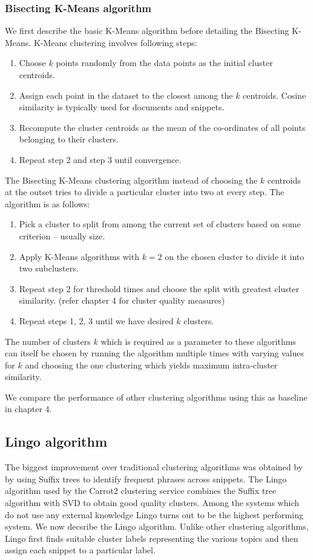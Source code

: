 \documentclass[a4paper,12pt]{report}
\begin{document}
\subsubsection{Bisecting K-Means algorithm}
We first describe the basic K-Means algorithm before detailing the
Bisecting K-Means. K-Means clustering involves following steps:
\begin{enumerate}
  \item Choose $k$ points randomly from the data points as the initial
    cluster centroids.
  \item Assign each point in the dataset to the closest among the $k$
    centroids. Cosine similarity is typically used for documents and
    snippets. 
  \item Recompute the cluster centroids as the mean of the
    co-ordinates of all points belonging to their clusters.
  \item Repeat step 2 and step 3 until convergence.
\end{enumerate}

The Bisecting K-Means clustering algorithm instead of choosing the $k$
centroids at the outset tries to divide a particular cluster into two
at every step. The algorithm is as follows:

\begin{enumerate}
  \item Pick a cluster to split from among the current set of clusters
    based on some criterion -- usually size.
  \item Apply K-Means algorithms with $k = 2$ on the chosen cluster to
    divide it into two subclusters.
  \item Repeat step 2 for threshold times and choose the split with
    greatest cluster similarity. (refer chapter 4 for cluster
    quality measures)
  \item Repeat steps 1, 2, 3 until we have desired $k$ clusters.
\end{enumerate}

The number of clusters $k$ which is required as a parameter to these
algorithms can itself be chosen by running the algorithm multiple
times with varying values for $k$ and choosing the one clustering
which yields maximum intra-cluster similarity.

We compare the performance of other clustering algorithms using this
as baseline in chapter 4.

\subsection{Lingo algorithm}
The biggest improvement over traditional clustering algorithms was
obtained by \cite{Zamir} by using Suffix trees to identify frequent
phrases across snippets. The Lingo algorithm used by the Carrot2
clustering service \cite{Weiss} combines the Suffix tree algorithm
with SVD to obtain good quality clusters. Among the systems which do
not use any external knowledge Lingo turns out to be the highest
performing system. We now decsribe the Lingo algorithm. Unlike other
clustering algorithms, Lingo first finds suitable cluster labels
representing the various topics and then assign each snippet to a
particular label.
\end{document}
